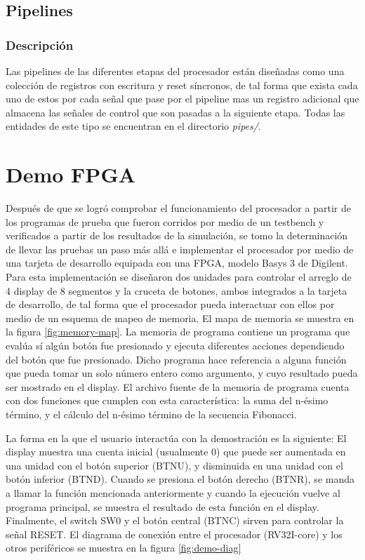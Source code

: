 \documentclass[11pt]{article}
\begin{document}
\subsection{Pipelines}
\subsubsection{Descripción}
Las pipelines de las diferentes etapas del procesador están diseñadas como una
colección de registros con escritura y reset síncronos, de tal forma que exista
cada uno de estos por cada señal que pase por el pipeline mas un registro
adicional que almacena las señales de control que son pasadas a la siguiente
etapa. Todas las entidades de este tipo se encuentran en el directorio
\textit{pipes/}.

\section{Demo FPGA}

Después de que se logró comprobar el funcionamiento del procesador a partir de
los programas de prueba que fueron corridos por medio de un testbench y
verificados a partir de los resultados de la simulación, se tomo la
determinación de llevar las pruebas un paso más allá e implementar el procesador 
por medio de una tarjeta de desarrollo equipada con una FPGA, modelo Basys 3 de
Digilent. Para esta implementación se diseñaron dos unidades para controlar el arreglo de 4
display de 8 segmentos y la cruceta de botones, ambos integrados a la
tarjeta de desarrollo, de tal forma que el procesador pueda interactuar con
ellos por medio de un esquema de mapeo de memoria. El mapa de memoria se
muestra en la figura \ref{fig:memory-map}. La memoria de programa
contiene un programa que evalúa sí algún botón fue presionado y ejecuta
diferentes acciones dependiendo del botón que fue presionado. Dicho programa
hace referencia a alguna función que pueda tomar un solo número entero como
argumento, y cuyo resultado pueda ser mostrado en el display. El archivo fuente
de la memoria de programa cuenta con dos funciones que cumplen con esta 
característica: la suma del n-ésimo término, y el cálculo del n-ésimo término 
de la secuencia Fibonacci.

La forma en la que el usuario interactúa con la demostración es
la siguiente: El display muestra una cuenta inicial (usualmente 0) que puede
ser aumentada en una unidad con el botón superior (BTNU), y disminuida en una unidad con
el botón inferior (BTND). Cuando se presiona el botón derecho (BTNR), se manda
a llamar la función mencionada anteriormente y cuando la ejecución vuelve al
programa principal, se muestra el resultado de esta función en el display.
Finalmente, el switch SW0 y el botón central (BTNC) sirven para controlar la
señal RESET. El diagrama de conexión entre el procesador (RV32I-core) y los
otros periféricos se muestra en la figura \ref{fig:demo-diag}
\end{document}
